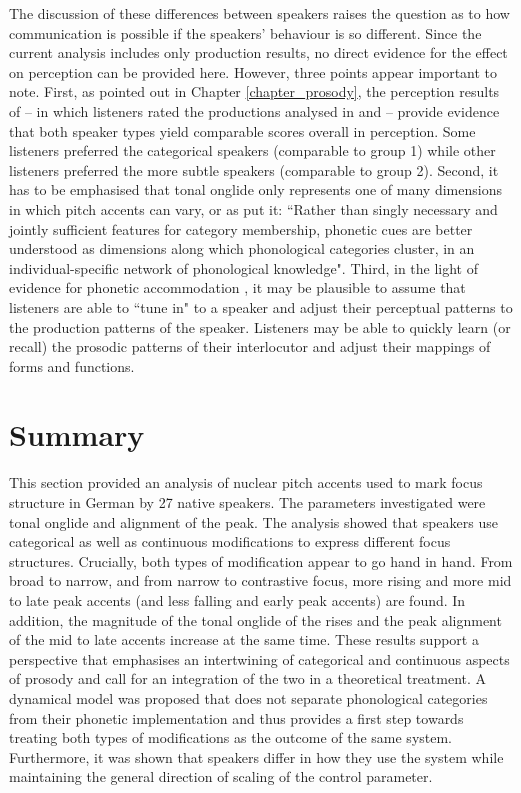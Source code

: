The discussion of these differences between speakers raises the question as to how communication is possible if the speakers' behaviour is so different. Since the current analysis includes only production results, no direct evidence for the effect on perception can be provided here. However, three points appear important to note. First, as pointed out in Chapter \ref{chapter_prosody}, the perception results of \citet{CangemiKrügerGrice2015} -- in which listeners rated the productions analysed in \citet{Griceetal2017} and \citet{MückeGrice2014} -- provide evidence that both speaker types yield comparable scores overall in perception. Some listeners preferred the categorical speakers (comparable to group 1) while other listeners preferred the more subtle speakers (comparable to group 2). Second, it has to be emphasised that tonal onglide only represents one of many dimensions in which pitch accents can vary, or as \citet[143]{CangemiKrügerGrice2015} put it: ``Rather than singly necessary and jointly sufficient features for category membership, phonetic cues are better understood as dimensions along which phonological categories cluster, in an individual-specific network of phonological knowledge". Third, in the light of evidence for phonetic accommodation \citep[e.g.][]{YuAbregoCollierSonderegger2013, Babel2009}, it may be plausible to assume that listeners are able to ``tune in" to a speaker and adjust their perceptual patterns to the production patterns of the speaker. Listeners may be able to quickly learn (or recall) the prosodic patterns of their interlocutor and adjust their mappings of forms and functions.

\section{Summary}

This section provided an analysis of nuclear pitch accents used to mark focus structure in German by 27 native speakers. The parameters investigated were tonal onglide and alignment of the peak. The analysis showed that speakers use categorical as well as continuous modifications to express different focus structures. Crucially, both types of modification appear to go hand in hand. From broad to narrow, and from narrow to contrastive focus, more rising and more mid to late peak accents (and less falling and early peak accents) are found. In addition, the magnitude of the tonal onglide of the rises and the peak alignment of the mid to late accents increase at the same time. These results support a perspective that emphasises an intertwining of categorical and continuous aspects of prosody and call for an integration of the two in a theoretical treatment. A dynamical model was proposed that does not separate phonological categories from their phonetic implementation and thus provides a first step towards treating both types of modifications as the outcome of the same system. Furthermore, it was shown that speakers differ in how they use the system while maintaining the general direction of scaling of the control parameter.

